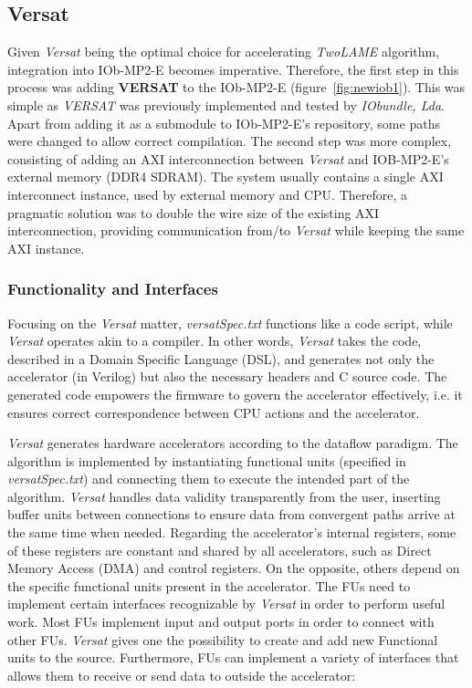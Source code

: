 \subsection{Versat}

Given \textit{Versat} being the optimal choice for accelerating \textit{TwoLAME} algorithm, integration into IOb-MP2-E becomes imperative.
Therefore, the first step in this process was adding \textbf{VERSAT} to the IOb-MP2-E (figure~\ref{fig:newiob1}). This was simple as \textit{VERSAT} was previously implemented and tested by \textit{IObundle, Lda}. Apart from adding it as a submodule to IOb-MP2-E's repository, some paths were changed to allow correct compilation.
The second step was more complex, consisting of adding an AXI interconnection between \textit{Versat} and IOB-MP2-E's external memory (DDR4 SDRAM). The system usually contains a single AXI~\cite{bib:axi_xilinx} interconnect instance, used by external memory and CPU. Therefore, a pragmatic solution was to double the wire size of the existing AXI interconnection, providing communication from/to \textit{Versat} while keeping the same AXI instance.

\subsubsection{Functionality and Interfaces}

Focusing on the \textit{Versat} matter, \textit{versatSpec.txt} functions like a code script, while \textit{Versat} operates akin to a compiler. In other words, \textit{Versat} takes the code, described in a Domain Specific Language (DSL), and generates not only the accelerator (in Verilog) but also the necessary headers and C source code. The generated code empowers the firmware to govern the accelerator effectively, i.e. it ensures correct correspondence between CPU actions and the accelerator.

\textit{Versat} generates hardware accelerators according to the dataflow paradigm. The algorithm is implemented by instantiating functional units (specified in \textit{versatSpec.txt}) and connecting them to execute the intended part of the algorithm. \textit{Versat} handles data validity transparently from the user, inserting buffer units between connections to ensure data from convergent paths arrive at the same time when needed.
Regarding the accelerator's internal registers, some of these registers are constant and shared by all accelerators, such as Direct Memory Access (DMA) and control registers. On the opposite, others depend on the specific functional units present in the accelerator.
The FUs need to implement certain interfaces recognizable by \textit{Versat} in order to perform useful work. Most FUs implement input and output ports in order to connect with other FUs. \textit{Versat} gives one the possibility to create and add new Functional units to the source. Furthermore, FUs can implement a variety of interfaces that allows them to receive or send data to outside the accelerator:

